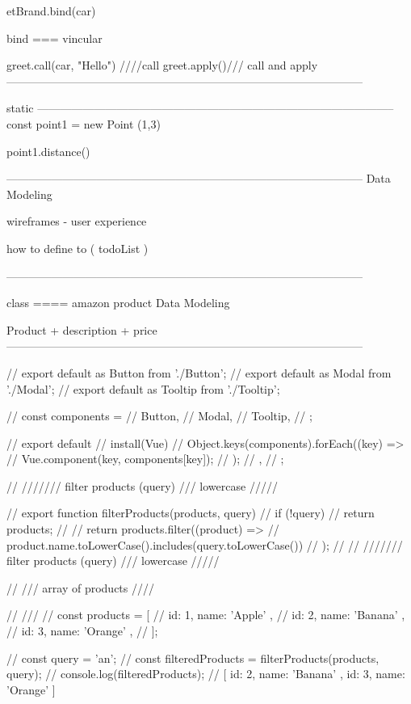 etBrand.bind(car)

bind === vincular

greet.call(car, "Hello") ////call
greet.apply()/// call and  apply 
-----------------------------------------------------------------------------------------------

static
-----------------------------------------------------------------------------------------------
const point1 = new Point (1,3)



point1.distance()

-----------------------------------------------------------------------------------------------
Data Modeling

wireframes - user experience

how to define to ( todoList )

-----------------------------------------------------------------------------------------------


class ==== amazon product Data Modeling

Product + description + price   
-----------------------------------------------------------------------------------------------

// export { default as Button } from './Button';
// export { default as Modal } from './Modal';
// export { default as Tooltip } from './Tooltip';


// const components = {
//   Button,
//   Modal,
//   Tooltip,
// };

// export default {
//   install(Vue) {
//     Object.keys(components).forEach((key) => {
//       Vue.component(key, components[key]);
//     });
//   },
// };         



// /////// filter products (query) /// lowercase /////

// export function filterProducts(products, query) {
//   if (!query) {
//     return products;
//   }
//   return products.filter((product) =>
//     product.name.toLowerCase().includes(query.toLowerCase())
//   );
// }
// /////// filter products (query) /// lowercase /////

// /// array of products ////

// ///
// const products = [
//   { id: 1, name: 'Apple' },
//   { id: 2, name: 'Banana' },
//   { id: 3, name: 'Orange' },
// ];

// const query = 'an';
// const filteredProducts = filterProducts(products, query);
// console.log(filteredProducts); // [{ id: 2, name: 'Banana' }, { id: 3, name: 'Orange' }]



